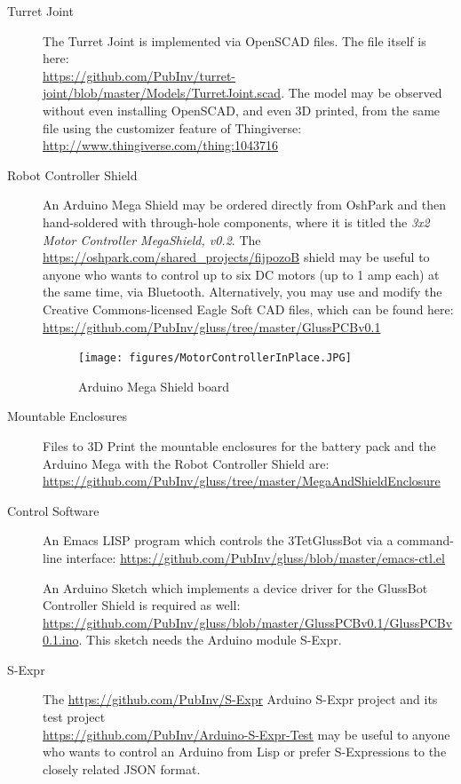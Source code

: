 \documentclass[11pt]{article}
\begin{document}
\begin{description}
  
\item [Turret Joint]
  The Turret Joint is implemented via OpenSCAD files. The file itself is here:\\
  \url{https://github.com/PubInv/turret-joint/blob/master/Models/TurretJoint.scad}.
       The model may be observed without even installing OpenSCAD, and even 3D printed,
       from the same file using the customizer feature of Thingiverse:\\
       \url{http://www.thingiverse.com/thing:1043716}
  
\item [Robot Controller Shield]
  An Arduino Mega Shield may be ordered directly from OshPark and then hand-soldered with through-hole components,
  where it is titled the \emph{3x2 Motor Controller MegaShield, v0.2}.
  The \url{https://oshpark.com/shared_projects/fijpozoB} shield
  may be useful to anyone who wants to control up to six DC motors (up to 1 amp each) at the same time, via Bluetooth.
  Alternatively, you may use and modify the Creative Commons-licensed Eagle Soft CAD files, which can be found here:\\
  \url{https://github.com/PubInv/gluss/tree/master/GlussPCBv0.1}
   \begin{figure}[H]
     \centering
     \texttt{[image: figures/MotorControllerInPlace.JPG]}
     \caption{Arduino Mega Shield board}
   \end{figure}

\item [Mountable Enclosures]
  Files to 3D Print the mountable enclosures for the battery pack and the Arduino Mega with the Robot Controller Shield are:\\
  \url{https://github.com/PubInv/gluss/tree/master/MegaAndShieldEnclosure}

\item [Control Software]
An Emacs LISP program which controls the 3TetGlussBot via a command-line interface:
\url{https://github.com/PubInv/gluss/blob/master/emacs-ctl.el}

An Arduino Sketch which implements a device driver for the GlussBot Controller Shield is required as well:\\

\url{https://github.com/PubInv/gluss/blob/master/GlussPCBv0.1/GlussPCBv0.1.ino}.
     This sketch needs the Arduino module S-Expr.
     
\item [S-Expr]
  The \url{https://github.com/PubInv/S-Expr} Arduino S-Expr project and its
  test project \\
  \url{https://github.com/PubInv/Arduino-S-Expr-Test}
  may be useful to anyone who wants to control an Arduino from Lisp or prefer S-Expressions to the closely related JSON format.

  
\end{description}
\end{document}
